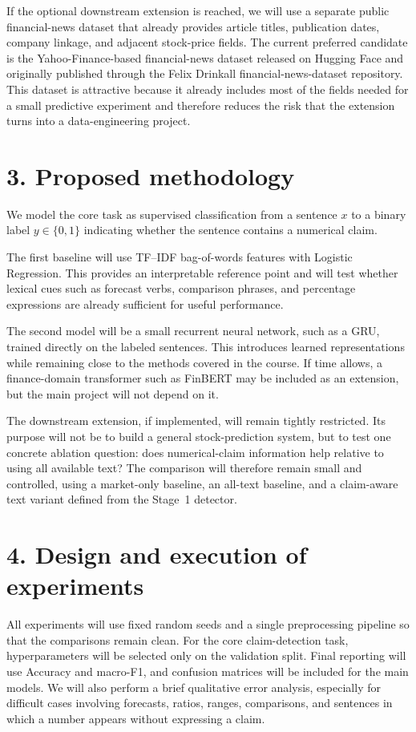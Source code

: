 \documentclass[11pt]{article}
\begin{document}
If the optional downstream extension is reached, we will use a separate public financial-news dataset that already provides article titles, publication dates, company linkage, and adjacent stock-price fields. The current preferred candidate is the Yahoo-Finance-based financial-news dataset released on Hugging Face and originally published through the Felix Drinkall financial-news-dataset repository. This dataset is attractive because it already includes most of the fields needed for a small predictive experiment and therefore reduces the risk that the extension turns into a data-engineering project.

\section*{3. Proposed methodology}
We model the core task as supervised classification from a sentence $x$ to a binary label $y \in \{0,1\}$ indicating whether the sentence contains a numerical claim.

The first baseline will use TF--IDF bag-of-words features with Logistic Regression. This provides an interpretable reference point and will test whether lexical cues such as forecast verbs, comparison phrases, and percentage expressions are already sufficient for useful performance.

The second model will be a small recurrent neural network, such as a GRU, trained directly on the labeled sentences. This introduces learned representations while remaining close to the methods covered in the course. If time allows, a finance-domain transformer such as FinBERT may be included as an extension, but the main project will not depend on it.

The downstream extension, if implemented, will remain tightly restricted. Its purpose will not be to build a general stock-prediction system, but to test one concrete ablation question: does numerical-claim information help relative to using all available text? The comparison will therefore remain small and controlled, using a market-only baseline, an all-text baseline, and a claim-aware text variant defined from the Stage~1 detector.

\section*{4. Design and execution of experiments}
All experiments will use fixed random seeds and a single preprocessing pipeline so that the comparisons remain clean. For the core claim-detection task, hyperparameters will be selected only on the validation split. Final reporting will use Accuracy and macro-F1, and confusion matrices will be included for the main models. We will also perform a brief qualitative error analysis, especially for difficult cases involving forecasts, ratios, ranges, comparisons, and sentences in which a number appears without expressing a claim.
\end{document}

